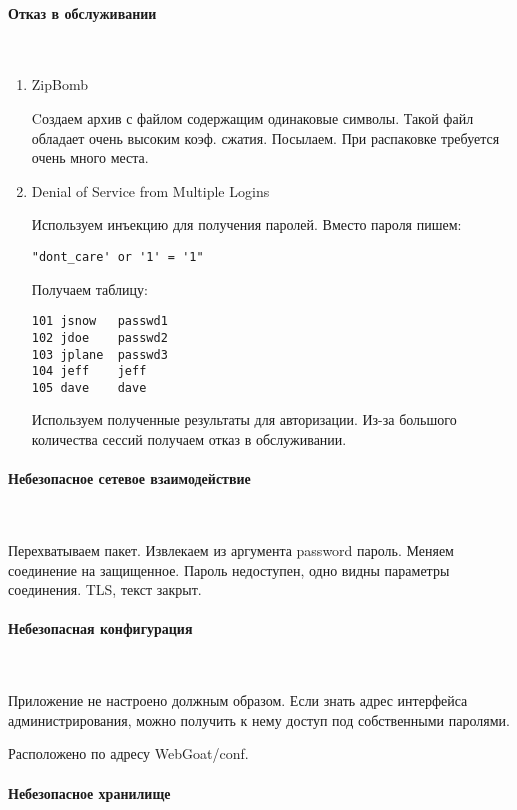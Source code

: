 \documentclass{article}
\begin{document}
\paragraph{Отказ в обслуживании}
~

\begin{enumerate}
\item ZipBomb 

Cоздаем архив с файлом содержащим одинаковые символы. Такой файл обладает очень высоким коэф. сжатия. Посылаем. При распаковке требуется очень много места.

\item Denial of Service from Multiple Logins

Используем инъекцию для получения паролей. Вместо пароля пишем:
\begin{verbatim}
"dont_care' or '1' = '1"
\end{verbatim}

Получаем таблицу:
\begin{verbatim}
101	jsnow	passwd1	
102	jdoe	passwd2	
103	jplane	passwd3	
104	jeff	jeff	
105	dave	dave	
\end{verbatim}

Используем полученные результаты для авторизации. Из-за большого количества сессий получаем отказ в обслуживании.

\end{enumerate}

\paragraph{Небезопасное сетевое взаимодействие}
~

Перехватываем пакет. Извлекаем из аргумента password пароль. Меняем соединение на защищенное. Пароль недоступен, одно видны параметры соединения. TLS, текст закрыт.

\paragraph{Небезопасная конфигурация}
~

Приложение не настроено должным образом. Если знать адрес интерфейса администрирования, можно получить к нему доступ под собственными паролями.

Расположено по адресу WebGoat/conf.

\paragraph{Небезопасное хранилище}
~
\end{document}
